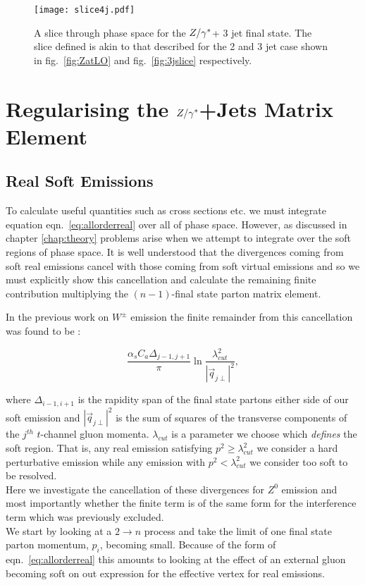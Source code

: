 		\begin{figure}[hbt]
		  \begin{center}
		    \texttt{[image: slice4j.pdf]}
		    \caption{A slice through phase space for the $Z/\gamma^*$+ 3 jet final state.  The slice defined is
		    akin to that described for the 2 and 3 jet case shown in fig.~\eqref{fig:ZatLO} and
		    fig.~\eqref{fig:3jslice} respectively.}
		    \label{fig:4jslice}
		  \end{center}
		\end{figure}

\section{Regularising the $Z/\gamma^*$+Jets Matrix Element}
	\label{sec:regularising}

	\subsection{Real Soft Emissions}
		\label{sub:softEmissions}

		To calculate useful quantities such as cross sections etc. we must integrate equation
		eqn.~\eqref{eq:allorderreal} over all of phase space.  However, as discussed in chapter \ref{chap:theory}
		problems arise when we attempt to integrate over the soft regions of phase space.  It is well understood
		that the divergences coming from soft real emissions cancel with those coming from soft
		virtual emissions and so we must explicitly show this cancellation and calculate the remaining
		finite contribution multiplying the $(n-1)$-final state parton matrix element.

		In the previous work on $W^\pm$ emission the finite remainder from this cancellation was found
		to be \cite{Andersen:2009nu, Andersen:2008gc}:

		\begin{equation}
			\frac{\alpha_s C_a \Delta_{j-1, j+1}}{\pi}\ln{\frac{\lambda_{cut}^2}{|\vec{q}_{j\perp}|^2}},
		\end{equation}

		where $\Delta_{i-1, i+1}$ is the rapidity span of the final state partons either side of our
		soft emission and $|\vec{q}_{j\perp}|^2$ is the sum of squares of the transverse components of
		the $j^{th}$ $t$-channel gluon momenta.  $\lambda_{cut}$ is a parameter we choose which \emph{defines}
		the soft region.  That is, any real emission satisfying $p^2 \geq \lambda_{cut}^2$ we consider a hard perturbative
		emission while any emission with $p^2 < \lambda_{cut}^2$ we consider too soft to be resolved.\\
		Here we investigate
		the cancellation of these divergences for $Z^0$ emission and most importantly whether the finite term
		is of the same form for the interference term which was previously excluded.\\We start by looking
		at a $2\rightarrow n$ process and take the limit of one final state parton momentum, $p_i$, becoming
		small.  Because of the form of eqn.~\eqref{eq:allorderreal} this amounts to looking at the
		effect of an external gluon becoming soft on out expression for the effective vertex for real emissions.

